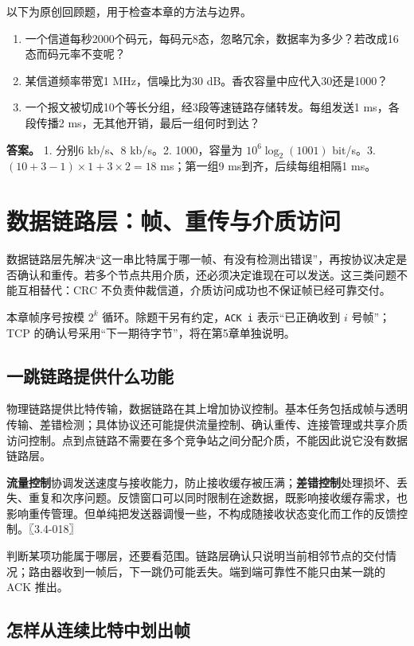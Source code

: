以下为原创回顾题，用于检查本章的方法与边界。

\begin{enumerate}
\def\labelenumi{\arabic{enumi}.}
\tightlist
\item
  一个信道每秒2000个码元，每码元8态，忽略冗余，数据率为多少？若改成16态而码元率不变呢？
\item
  某信道频率带宽1 MHz，信噪比为30 dB。香农容量中应代入30还是1000？
\item
  一个报文被切成10个等长分组，经3段等速链路存储转发。每组发送1 ms，各段传播2 ms，无其他开销，最后一组何时到达？
\end{enumerate}

\textbf{答案。} 1. 分别6 kb/s、8 kb/s。2. 1000，容量为 \(10^6\log_2(1001)\) bit/s。3. \((10+3-1)\times1+3\times2=18\) ms；第一组9 ms到齐，后续每组相隔1 ms。

\chapter{数据链路层：帧、重传与介质访问}\label{cn-ch3}

数据链路层先解决``这一串比特属于哪一帧、有没有检测出错误''，再按协议决定是否确认和重传。若多个节点共用介质，还必须决定谁现在可以发送。这三类问题不能互相替代：CRC 不负责仲裁信道，介质访问成功也不保证帧已经可靠交付。

本章帧序号按模 \(2^k\) 循环。除题干另有约定，\texttt{ACK\ i} 表示``已正确收到 \(i\) 号帧''；TCP 的确认号采用``下一期待字节''，将在第5章单独说明。

\section{一跳链路提供什么功能}\label{cn-03-01}

物理链路提供比特传输，数据链路在其上增加协议控制。基本任务包括成帧与透明传输、差错检测；具体协议还可能提供流量控制、确认重传、连接管理或共享介质访问控制。点到点链路不需要在多个竞争站之间分配介质，不能因此说它没有数据链路层。

\textbf{流量控制}协调发送速度与接收能力，防止接收缓存被压满；\textbf{差错控制}处理损坏、丢失、重复和次序问题。反馈窗口可以同时限制在途数据，既影响接收缓存需求，也影响重传管理。但单纯把发送器调慢一些，不构成随接收状态变化而工作的反馈控制。〖3.4-018〗

判断某项功能属于哪层，还要看范围。链路层确认只说明当前相邻节点的交付情况；路由器收到一帧后，下一跳仍可能丢失。端到端可靠性不能只由某一跳的 ACK 推出。

\section{怎样从连续比特中划出帧}\label{cn-03-02}

